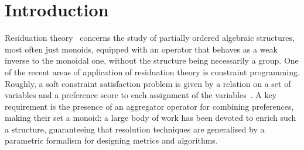 \documentclass[a4paper]{elsarticle}
\newcommand{\1}{\mathbf{1}}
\begin{document}
\section{Introduction}\label{sec:intro}
Residuation theory~\cite{residuation} concerns the study of partially ordered algebraic structures, most often just monoids, 
equipped with an operator that behaves as a weak inverse to the monoidal one, without the structure being necessarily a group.
%
One of the recent areas of application of residuation theory is constraint programming. 
%
Roughly, a soft constraint satisfaction problem
is given by a relation on a set of variables and a preference 
score to each assignment of the variables~\cite{jacm97,schiex}. 
%
A key requirement is the presence of an aggregator operator for combining preferences, making their set a monoid: a large body 
of work has been devoted to enrich such a structure, guaranteeing that resolution techniques are generalised by 
a parametric formalism for designing metrics and algorithms.
%
\end{document}
